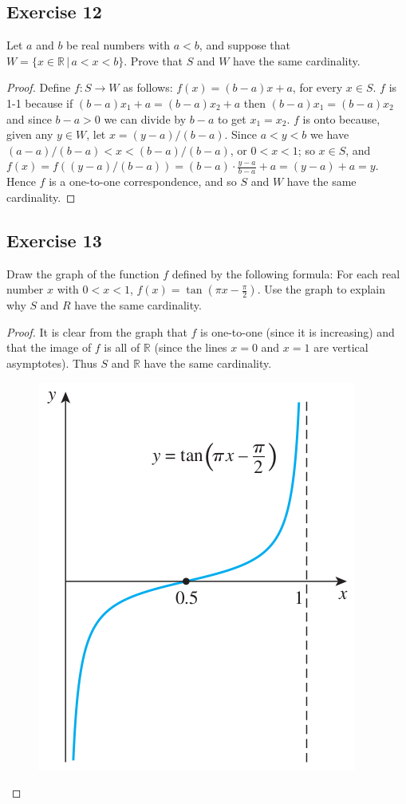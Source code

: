 \documentclass[14pt]{extarticle}
\newcommand{\R}{\mathbb{R}}
\begin{document}
\subsection{Exercise 12}
Let $a$ and $b$ be real numbers with $a < b$, and suppose that \(W = \{x \in \R \,|\, a < x < b\}\). Prove that $S$
and $W$ have the same cardinality.

\begin{proof}
Define \(f: S \to W\) as follows: \(f(x) = (b-a)x + a\), for every \(x \in S\). $f$ is 1-1 because if \((b-a)x_1 + a 
= (b-a)x_2 + a\) then \((b-a)x_1 = (b-a)x_2\) and since \(b-a>0\) we can divide by \(b-a\) to get \(x_1 = x_2\). $f$ 
is onto because, given any \(y \in W\), let \(x = (y-a)/(b-a)\). Since \(a < y < b\) we have \((a-a)/(b-a) < x < (b-
a)/(b-a)\), or \(0 < x < 1\); so \(x \in S\), and \(f(x) = f((y-a)/(b-a))=(b-a)\cdot\frac{y-a}{b-a}+a = (y-a)+a = y\). 
Hence $f$ is a one-to-one correspondence, and so $S$ and $W$ have the same cardinality.
\end{proof}

\subsection{Exercise 13}
Draw the graph of the function $f$ defined by the following formula: For each real number $x$ with \(0 < x < 1\), 
\(f(x) = \tan(\pi x - \frac{\pi}{2})\). Use the graph to explain why $S$ and $R$ have the same cardinality.

\begin{proof}
It is clear from the graph that $f$ is one-to-one (since it is increasing) and that the image of $f$ is all of $\R$ 
(since the lines $x = 0$ and $x = 1$ are vertical asymptotes). Thus $S$ and $\R$ have the same cardinality.

\begin{figure}[ht!]
\centering
\includegraphics[scale=0.4]{../images/7.4.13.png}
\end{figure}
\end{proof}
\end{document}
